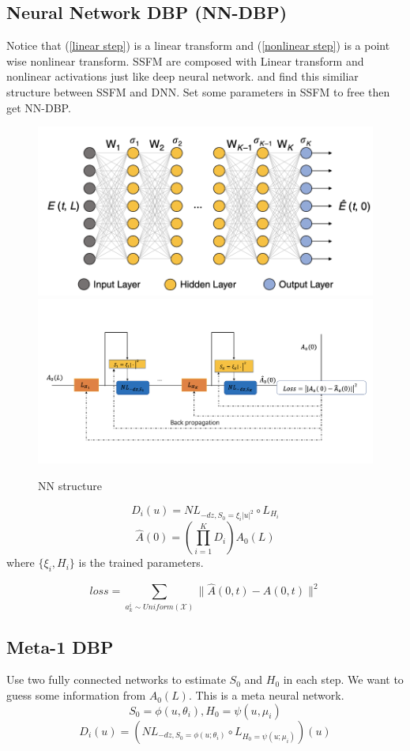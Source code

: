 \subsection{Neural Network DBP (NN-DBP)}
Notice that (\ref{linear step}) is a linear transform and (\ref{nonlinear step}) is a 
point wise nonlinear transform. SSFM are composed with Linear transform and nonlinear activations just like deep neural 
network.\cite{hager2020} and \cite{fan2020NC} find this similiar structure 
between SSFM and DNN. Set some parameters in SSFM to free then get NN-DBP. 
\begin{figure}[htbp]
\centering
\includegraphics[width=0.6\linewidth]{img/NN.png}
\includegraphics[width=0.6\linewidth]{img/NN-DBP.png}
\caption{NN structure \cite{fan2020NC}}
\label{NN}
\end{figure}
$$
D_i(u) = NL_{-dz,S_0 = \xi_i |u|^2} \circ L_{H_i}
$$
$$
\hat{A}(0) = \left(\prod_{i=1}^{K} D_i\right)A_0(L)
$$
where $\{\xi_i,H_i\}$ is the trained parameters.

$$
loss = \sum_{a_k^i \sim Uniform(\mathcal{X})} \|\hat{A}(0,t) - A(0,t)\|^2
$$

\subsection{Meta-1 DBP}
Use two fully connected networks to estimate $S_0$ and $H_0$ in each step. We want to guess some information
 from $A_0(L)$. This is a meta neural network.
\begin{equation}
S_0 = \phi(u,\theta_i), H_0 = \psi(u,\mu_i)
\end{equation}
$$
D_i(u) = \left(NL_{-dz,S_0=\phi(u;\theta_i)} \circ L_{H_0=\psi(u;\mu_i)}\right) (u)
$$

